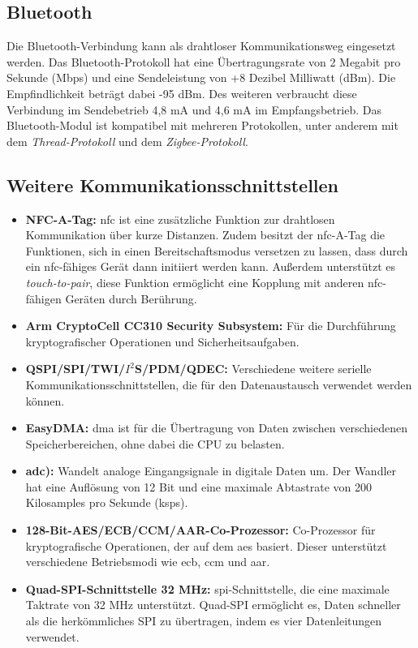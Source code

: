 \subsection{Bluetooth}

Die Bluetooth-Verbindung kann als drahtloser Kommunikationsweg eingesetzt werden. Das Bluetooth-Protokoll hat eine Übertragungsrate von 2 Megabit pro Sekunde (Mbps) und eine Sendeleistung von +8 Dezibel Milliwatt (dBm). Die Empfindlichkeit beträgt dabei -95 dBm. Des weiteren verbraucht diese Verbindung im Sendebetrieb 4,8 mA und 4,6 mA im Empfangsbetrieb. Das Bluetooth-Modul ist kompatibel mit mehreren Protokollen, unter anderem mit dem \textit{Thread-Protokoll} und dem \textit{Zigbee-Protokoll}.\cite{Ard.2024} \cite{NrdSem4.2024}

\subsection{Weitere Kommunikationsschnittstellen}
\cite{Ard.2024}
	\begin{itemize}
		\item \textbf{NFC-A-Tag:} \ac{nfc} ist eine zusätzliche Funktion zur drahtlosen Kommunikation über kurze Distanzen. Zudem besitzt der \ac{nfc}-A-Tag die Funktionen, sich in einen Bereitschaftsmodus versetzen zu lassen, dass durch ein \ac{nfc}-fähiges Gerät dann initiiert werden kann. Außerdem unterstützt es \textit{touch-to-pair}, diese Funktion ermöglicht eine Kopplung mit anderen \ac{nfc}-fähigen Geräten durch Berührung.
		\item \textbf{Arm CryptoCell CC310 Security Subsystem:} Für die Durchführung kryptografischer Operationen und Sicherheitsaufgaben.\\ \cite{NrdSem.2024}
		\item \textbf{QSPI/SPI/TWI/$I^2$S/PDM/QDEC:} Verschiedene weitere serielle Kommunikationsschnittstellen, die für den Datenaustausch verwendet werden können.
		\item \textbf{EasyDMA:} \ac{dma} ist für die Übertragung von Daten zwischen verschiedenen Speicherbereichen, ohne dabei die CPU zu belasten.\cite{Gehrke.2022}
		\item \textbf{\ac{adc}):} Wandelt analoge Eingangsignale in digitale Daten um. Der Wandler hat eine Auflösung von 12 Bit und eine maximale Abtastrate von 200 Kilosamples pro Sekunde (ksps).
		\item \textbf{128-Bit-AES/ECB/CCM/AAR-Co-Prozessor:} Co-Prozessor für kryptografische Operationen, der auf dem \ac{aes} basiert. Dieser unterstützt verschiedene Betriebsmodi wie \ac{ecb}, \ac{ccm} und \ac{aar}. \cite{NrdSem2.2024}
		\item \textbf{Quad-SPI-Schnittstelle 32 MHz:} \ac{spi}-Schnittstelle, die eine maximale Taktrate von 32 MHz unterstützt. Quad-SPI ermöglicht es, Daten schneller als die herkömmliches SPI zu übertragen, indem es vier Datenleitungen verwendet.\cite{NrdSem3.2023}
	\end{itemize}

